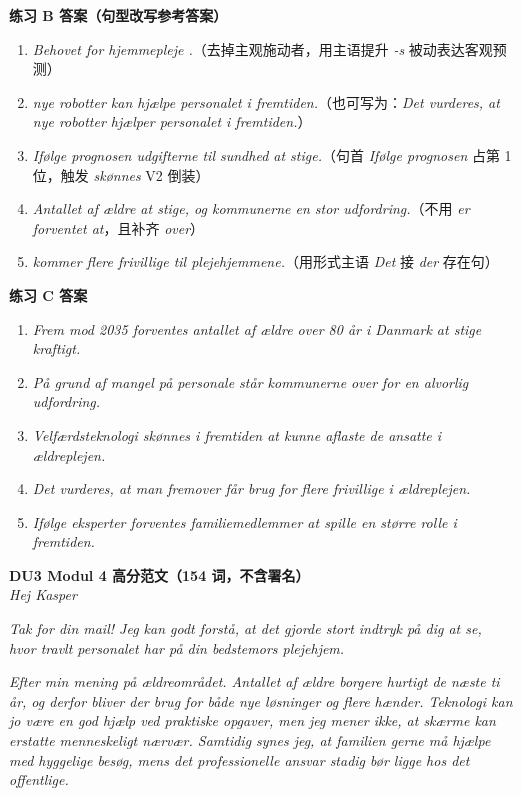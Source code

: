 \begin{answerbox}
\textbf{练习 B 答案（句型改写参考答案）}
\begin{enumerate}
  \item \textit{Behovet for hjemmepleje .}（去掉主观施动者，用主语提升 \textit{-s} 被动表达客观预测）
  \item \textit{ nye robotter kan hjælpe personalet i fremtiden.}（也可写为：\textit{Det vurderes, at nye robotter hjælper personalet i fremtiden.}）
  \item \textit{Ifølge prognosen  udgifterne til sundhed at stige.}（句首 \textit{Ifølge prognosen} 占第 1 位，触发 \textit{skønnes} V2 倒装）
  \item \textit{Antallet af ældre  at stige, og kommunerne  en stor udfordring.}（不用 \textit{er forventet at}，且补齐 \textit{over}）
  \item \textit{ kommer flere frivillige til plejehjemmene.}（用形式主语 \textit{Det} 接 \textit{der} 存在句）
\end{enumerate}

\textbf{练习 C 答案}
\begin{enumerate}
  \item \textit{Frem mod 2035 forventes antallet af ældre over 80 år i Danmark at stige kraftigt.}
  \item \textit{På grund af mangel på personale står kommunerne over for en alvorlig udfordring.}
  \item \textit{Velfærdsteknologi skønnes i fremtiden at kunne aflaste de ansatte i ældreplejen.}
  \item \textit{Det vurderes, at man fremover får brug for flere frivillige i ældreplejen.}
  \item \textit{Ifølge eksperter forventes familiemedlemmer at spille en større rolle i fremtiden.}
\end{enumerate}

\textbf{DU3 Modul 4 高分范文（154 词，不含署名）}\\
\textit{Hej Kasper}

\textit{Tak for din mail! Jeg kan godt forstå, at det gjorde stort indtryk på dig at se, hvor travlt personalet har på din bedstemors plejehjem.}

\textit{Efter min mening  på ældreområdet. Antallet af ældre borgere  hurtigt de næste ti år, og derfor bliver der brug for både nye løsninger og flere hænder. Teknologi kan jo være en god hjælp ved praktiske opgaver, men jeg mener ikke, at skærme kan erstatte menneskeligt nærvær. Samtidig synes jeg, at familien gerne må hjælpe med hyggelige besøg, mens det professionelle ansvar stadig bør ligge hos det offentlige.}


\end{answerbox}
